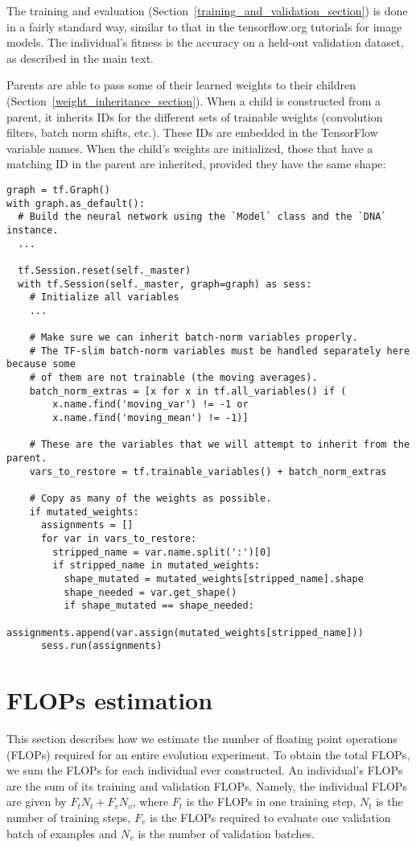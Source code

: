 \documentclass{article}
\begin{document}
The training and evaluation (Section~\ref{training_and_validation_section}) is done in a fairly standard way, similar to that in the tensorflow.org tutorials for image models. The individual's fitness is the accuracy on a held-out validation dataset, as described in the main text.

Parents are able to pass some of their learned weights to their children (Section~\ref{weight_inheritance_section}). When a child is constructed from a parent, it inherits IDs for the different sets of trainable weights (convolution filters, batch norm shifts, etc.). These IDs are embedded in the TensorFlow variable names. When the child's weights are initialized, those that have a matching ID in the parent are inherited, provided they have the same shape:
\smallskip
\begin{lstlisting}
graph = tf.Graph()
with graph.as_default():
  # Build the neural network using the `Model` class and the `DNA` instance.
  ...

  tf.Session.reset(self._master)
  with tf.Session(self._master, graph=graph) as sess:
    # Initialize all variables
    ...

    # Make sure we can inherit batch-norm variables properly.
    # The TF-slim batch-norm variables must be handled separately here because some
    # of them are not trainable (the moving averages).
    batch_norm_extras = [x for x in tf.all_variables() if (
        x.name.find('moving_var') != -1 or
        x.name.find('moving_mean') != -1)]
        
    # These are the variables that we will attempt to inherit from the parent.
    vars_to_restore = tf.trainable_variables() + batch_norm_extras
    
    # Copy as many of the weights as possible.
    if mutated_weights:
      assignments = []
      for var in vars_to_restore:
        stripped_name = var.name.split(':')[0]
        if stripped_name in mutated_weights:
          shape_mutated = mutated_weights[stripped_name].shape
          shape_needed = var.get_shape()
          if shape_mutated == shape_needed:
            assignments.append(var.assign(mutated_weights[stripped_name]))
      sess.run(assignments)
\end{lstlisting}


\section{FLOPs estimation}


This section describes how we estimate the number of floating point operations (FLOPs) required for an entire evolution experiment. To obtain the total FLOPs, we sum the FLOPs for each individual ever constructed. An individual's FLOPs are the sum of its training and validation FLOPs. Namely, the individual FLOPs are given by $F_t N_t + F_v N_v$, where $F_t$ is the FLOPs in one training step, $N_t$ is the number of training steps, $F_v$ is the FLOPs required to evaluate one validation batch of examples and $N_v$ is the number of validation batches.
\end{document}
